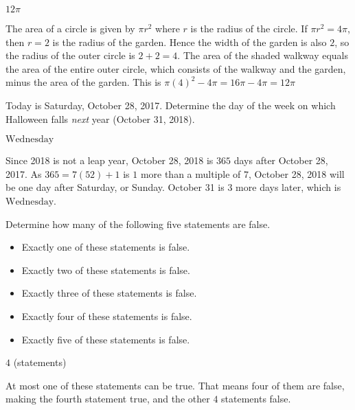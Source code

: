 \documentclass[11pt]{article}
\begin{document}
\begin{answer}
$\boxed{12\pi}$
\end{answer}

\begin{solution}
The area of a circle is given by $\pi r^2$ where $r$ is the radius of the circle.
If $\pi r^2 = 4\pi$, then $r = 2$ is the radius of the garden. Hence the width
of the garden is also $2$, so the radius of the outer circle is $2+2 = 4$.
The area of the shaded walkway equals the area of the entire outer circle,
which consists of the walkway and the garden, minus the area of the garden.
This is $\pi(4)^2 - 4\pi = 16\pi - 4\pi = \boxed{12\pi}$
\end{solution}


\begin{problem}
Today is Saturday, October 28, 2017. Determine the day of the week on which Halloween falls \textit{next} year
(October 31, 2018).
\end{problem}

\begin{answer}
$\boxed{\text{Wednesday}}$
\end{answer}

\begin{solution}
Since 2018 is not a leap year, October 28, 2018 is $365$ days after October 28, 2017. As $365 = 7(52)+1$ is
$1$ more than a multiple of $7$, October 28, 2018 will be one day after Saturday, or Sunday.
October 31 is $3$ more days later, which is $\boxed{\text{Wednesday}}$.
\end{solution}


\begin{problem}%
Determine how many of the following five statements are false.
\begin{itemize}
\item Exactly one of these statements is false.
\item Exactly two of these statements is false.
\item Exactly three of these statements is false.
\item Exactly four of these statements is false.
\item Exactly five of these statements is false.
\end{itemize}
\end{problem}

\begin{answer}
$\boxed{4}$ (statements)
\end{answer}

\begin{solution}
At most one of these statements can be true. That means four of them are false, making the
fourth statement true, and the other $\boxed{4}$ statements false.
\end{solution}
\end{document}
